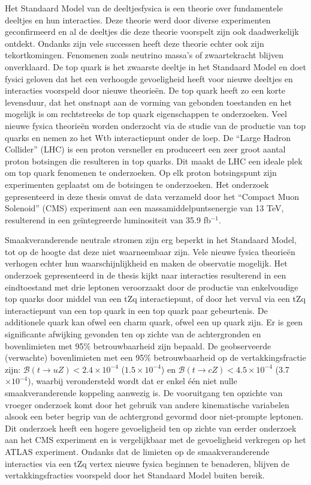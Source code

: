 \chapterprecishere{\Titledutch}
Het Standaard Model van de deeltjesfysica is een theorie over fundamentele deeltjes en hun interacties. Deze theorie werd door diverse experimenten geconfirmeerd en al de deeltjes die deze theorie voorspelt zijn ook daadwerkelijk ontdekt. Ondanks zijn vele successen heeft deze theorie echter ook zijn tekortkomingen. Fenomenen zoals neutrino massa's of zwaartekracht blijven onverklaard. De top quark is het zwaarste deeltje in het Standaard Model en doet fysici geloven dat het een verhoogde gevoeligheid heeft voor nieuwe deeltjes en interacties voorspeld door nieuwe theorie\"en. De top quark heeft zo een korte levensduur, dat het onstnapt aan de vorming van gebonden toestanden en het mogelijk is om rechtstreeks de top quark eigenschappen te onderzoeken. 
Veel nieuwe fysica theorie\"en worden onderzocht  via de studie van de productie van top quarks en nemen zo het Wtb interactiepunt onder de loep. De  ``Large Hadron Collider'' (LHC) is een proton versneller en produceert een zeer groot aantal proton botsingen die resulteren in top quarks.  Dit maakt de LHC een ideale plek om top quark fenomenen te onderzoeken. Op elk proton 
botsingspunt zijn experimenten geplaatst om de botsingen te onderzoeken.  Het onderzoek gepresenteerd in deze thesis omvat de data verzameld door het ``Compact Muon Solenoid'' (CMS) experiment aan een massamiddelpuntsenergie van  13 TeV, resulterend in een ge\"integreerde luminositeit van 35.9 fb$^{-1}$. 


Smaakveranderende neutrale stromen zijn erg beperkt in het Standaard Model, tot op de hoogte dat deze niet waarneembaar zijn. Vele nieuwe fysica theorie\"en verhogen echter hun waarschijnlijkheid en maken de observatie mogelijk. Het onderzoek gepresenteerd in de thesis kijkt naar interacties resulterend in een eindtoestand met drie leptonen veroorzaakt door de productie van enkelvoudige top quarks door middel van een tZq interactiepunt, of door het verval via een tZq interactiepunt van een top quark in een top quark paar gebeurtenis. De additionele quark kan ofwel een charm quark, ofwel een up quark zijn. Er is geen significante afwijking gevonden ten op zichte van de achtergronden en bovenlimieten met 95\% betrouwbaarheid zijn bepaald. De geobserveerde (verwachte) bovenlimieten met een 95$\%$ betrouwbaarheid op de vertakkingsfractie zijn: ${\mathcal{B}}(t \rightarrow uZ) < 2.4\times 10^{-4}$ ($1.5\times 10^{-4}$) en ${\mathcal{B}}(t \rightarrow cZ) < 4.5\times 10^{-4}$ (3.7$\times 10^{-4}$), waarbij verondersteld wordt dat er enkel \'e\'en niet nulle smaakveranderende koppeling aanwezig is. \newpage
\thispagestyle{empty}
De vooruitgang ten opzichte van vroeger onderzoek komt door het gebruik van andere kinematische variabelen alsook  een beter begrip van de achtergrond gevormd door niet-prompte leptonen.  Dit onderzoek heeft een  hogere gevoeligheid ten op zichte van eerder onderzoek aan het CMS experiment en is vergelijkbaar met de gevoeligheid verkregen op het ATLAS experiment. Ondanks dat 
de limieten op de smaakveranderende interacties via een tZq vertex nieuwe fysica beginnen te benaderen, blijven de vertakkingsfracties voorspeld door het Standaard Model buiten bereik. 